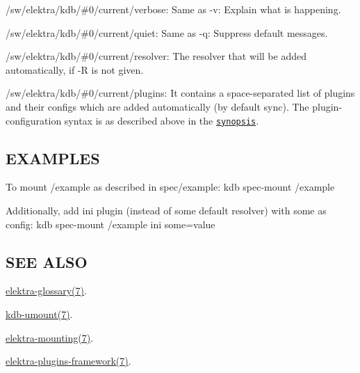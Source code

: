 \begin{DoxyItemize}
\item {\ttfamily /sw/elektra/kdb/\#0/current/verbose}\+: Same as {\ttfamily -\/v}\+: Explain what is happening.
\item {\ttfamily /sw/elektra/kdb/\#0/current/quiet}\+: Same as {\ttfamily -\/q}\+: Suppress default messages.
\item {\ttfamily /sw/elektra/kdb/\#0/current/resolver}\+: The resolver that will be added automatically, if {\ttfamily -\/\+R} is not given.
\item {\ttfamily /sw/elektra/kdb/\#0/current/plugins}\+: It contains a space-\/separated list of plugins and their configs which are added automatically (by default sync). The plugin-\/configuration syntax is as described above in the \href{#SYNOPSIS}{\tt synopsis}.
\end{DoxyItemize}

\subsection*{E\+X\+A\+M\+P\+L\+E\+S}

To mount /example as described in {\ttfamily spec/example}\+: {\ttfamily kdb spec-\/mount /example}

Additionally, add {\ttfamily ini} plugin (instead of some default resolver) with {\ttfamily some} as config\+: {\ttfamily kdb spec-\/mount /example ini some=value}

\subsection*{S\+E\+E A\+L\+S\+O}


\begin{DoxyItemize}
\item \hyperlink{md_doc_help_elektra-glossary_doc_help_elektra-glossary_md}{elektra-\/glossary(7)}.
\item \hyperlink{md_doc_help_kdb-umount_doc_help_kdb-umount_md}{kdb-\/umount(7)}.
\item \hyperlink{md_doc_help_elektra-mounting_doc_help_elektra-mounting_md}{elektra-\/mounting(7)}.
\item \hyperlink{md_doc_help_elektra-plugins-framework_doc_help_elektra-plugins-framework_md}{elektra-\/plugins-\/framework(7)}. 
\end{DoxyItemize}